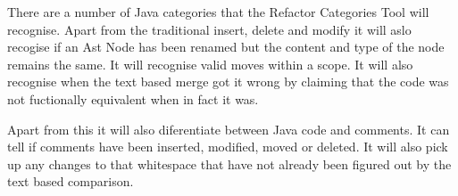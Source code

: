 There are a number of Java categories that the Refactor Categories Tool will recognise.  Apart from the traditional insert, delete and modify it will aslo recogise if an Ast Node has been renamed but the content and type of the node remains the same.  It will recognise valid moves within a scope. It will also recognise when the text based merge got it wrong by claiming that the code was not fuctionally equivalent when in fact it was.

Apart from this it will also diferentiate between Java code and comments.  It can tell if comments have been inserted, modified, moved or deleted.  It will also pick up any changes to that whitespace that have not already been figured out by the text based comparison.  

 
% 


% 
% 
% 
% 
% 
% 



